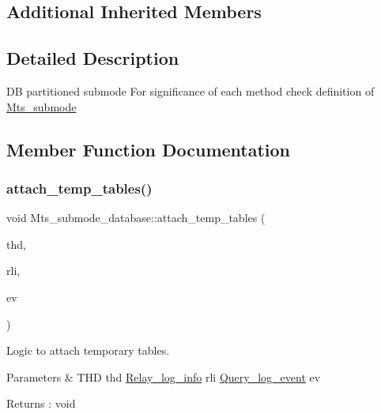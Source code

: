 \subsection*{Additional Inherited Members}


\subsection{Detailed Description}
DB partitioned submode For significance of each method check definition of \mbox{\hyperlink{classMts__submode}{Mts\+\_\+submode}} 

\subsection{Member Function Documentation}
\mbox{\label{classMts__submode__database_abcd2265dce959fd590c45960237b3eea}} 
\subsubsection{\texorpdfstring{attach\+\_\+temp\+\_\+tables()}{attach\_temp\_tables()}}
{\footnotesize\ttfamily void Mts\+\_\+submode\+\_\+database\+::attach\+\_\+temp\+\_\+tables (\begin{DoxyParamCaption}\item[{T\+HD $\ast$}]{thd,  }\item[{const \mbox{\hyperlink{classRelay__log__info}{Relay\+\_\+log\+\_\+info}} $\ast$}]{rli,  }\item[{\mbox{\hyperlink{classQuery__log__event}{Query\+\_\+log\+\_\+event}} $\ast$}]{ev }\end{DoxyParamCaption})\hspace{0.3cm}{\ttfamily [virtual]}}

Logic to attach temporary tables. 
\begin{DoxyParams}{Parameters}
{\em } & T\+HD thd \mbox{\hyperlink{classRelay__log__info}{Relay\+\_\+log\+\_\+info}} rli \mbox{\hyperlink{classQuery__log__event}{Query\+\_\+log\+\_\+event}} ev \\
\hline
\end{DoxyParams}
\begin{DoxyReturn}{Returns}
\+: void 
\end{DoxyReturn}


